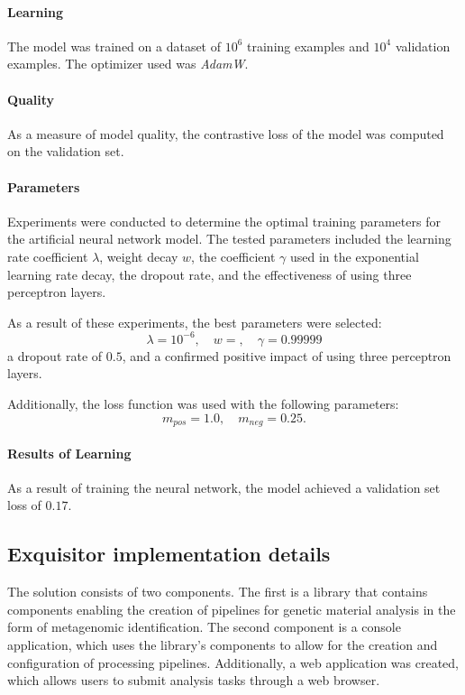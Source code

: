 \documentclass[pdflatex,sn-vancouver-num]{sn-jnl}%
\begin{document}
                \paragraph{Learning}
                The model was trained on a dataset of $10^{6}$ training examples and $10^{4}$ validation examples. The optimizer used was \textit{AdamW}\cite{Loshchilov2017DecoupledWD}.

                \paragraph{Quality}
                As a measure of model quality, the contrastive loss of the model was computed on the validation set.

                \paragraph{Parameters}
                Experiments were conducted to determine the optimal training parameters for the artificial neural network model. The tested parameters included the learning rate coefficient \( \lambda \), weight decay \( w \), the coefficient \( \gamma \) used in the exponential learning rate decay, the dropout rate, and the effectiveness of using three perceptron layers.

                As a result of these experiments, the best parameters were selected:
                \[
                \lambda = 10^{-6}, \quad w = , \quad \gamma = 0.99999
                \]
                a dropout rate of \( 0.5 \), and a confirmed positive impact of using three perceptron layers.

                Additionally, the loss function was used with the following parameters:
                \[
                m_{pos} = 1.0, \quad m_{neg} = 0.25.
                \]


                \paragraph{Results of Learning}
                As a result of training the neural network, the model achieved a validation set loss of $0.17$.


        \subsection{Exquisitor implementation details}
            The solution consists of two components. The first is a library that contains components enabling the creation of pipelines for genetic material analysis in the form of metagenomic identification. The second component is a console application, which uses the library's components to allow for the creation and configuration of processing pipelines. Additionally, a web application was created, which allows users to submit analysis tasks through a web browser.
\end{document}

